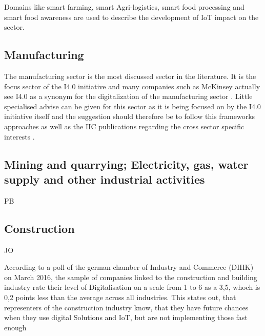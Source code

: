 
Domains like smart farming, smart Agri-logistics, smart food processing and smart food awareness are used to describe the development of \ac{IoT} impact on the sector.




\subsection{Manufacturing}
The manufacturing sector is the most discussed sector in the literature. It is the focus sector of the \ac{I4.0} initiative and many companies such as McKinsey actually see \ac{I4.0} as a synonym for the digitalization of the manufacturing sector \cite[]{McKinseydigitizationIndustrialSector:2015}. Little specialised advise can be given for this sector as it is being focused on by the \ac{I4.0} initiative itself and the suggestion should therefore be to follow this frameworks approaches as well as the \ac{IIC} publications regarding the cross sector specific interests \cite[]{iicarchitecture:2016}.

\subsection{Mining and quarrying; Electricity, gas, water supply and other industrial activities }
PB

\subsection{Construction}
JO


According to a poll of the german chamber of Industry and Commerce (\ac{DIHK}) on March 2016, the sample of companies linked to the construction and building industry rate their level of Digitalisation on a scale from 1 to 6 as a 3,5, whoch is 0,2 points less than the average across all industries. This states out, that representers of the construction industry know, that they have future chances when they use digital Solutions and \ac{IoT}, but are not implementing those fast enough %

